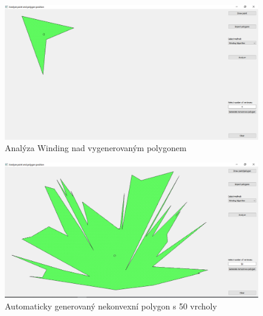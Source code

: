 \documentclass[a4paper,11pt,twoside]{article}
\begin{document}
\vspace{0.2cm}
\begin{figure}[hbt!] 
\begin{center}
\includegraphics[width=15cm]{pictures/windingongenerated.png} 
\caption[Analýza Winding nad vygenerovaným polygonem]{Analýza Winding nad vygenerovaným polygonem}
\label{fig:windingongenerated}
\end{center}
\end{figure}

\vspace{0.2cm}
\begin{figure}[hbt!] 
\begin{center}
\includegraphics[width=15cm]{pictures/50vertexes.png} 
\caption[Automaticky generovaný nekonvexní polygon s 50 vrcholy]{Automaticky generovaný nekonvexní polygon s 50 vrcholy}
\label{fig:50vertexes}
\end{center}
\end{figure}
\end{document}
